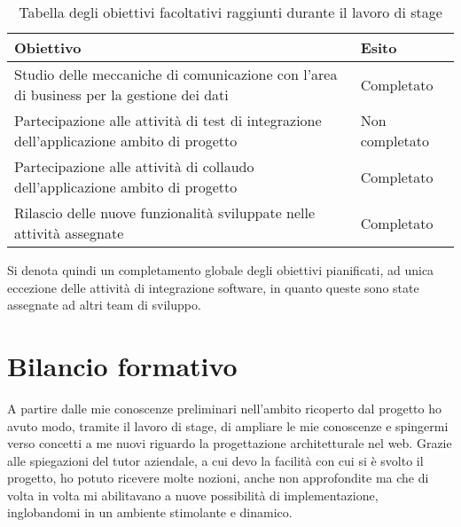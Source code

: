 	\begin{table}[H]
		\def\arraystretch{1.2}
		\begin{tabular}{ | p{10cm} | p{2cm} | }
		
		\rowcolor{Gray}
		\hline \textbf{Obiettivo} & \textbf{Esito} \\ \hline
		
		Studio delle meccaniche di comunicazione con l'area di business per la gestione dei dati & Completato \\ \hline
		Partecipazione alle attività di test di integrazione dell'applicazione ambito di progetto & Non \newline completato \\ \hline
		Partecipazione alle attività di collaudo dell'applicazione ambito di progetto & Completato \\ \hline
		Rilascio delle nuove funzionalità sviluppate nelle attività assegnate & Completato \\ \hline
		
		\end{tabular}
		\vspace{1mm}
		\caption{Tabella degli obiettivi facoltativi raggiunti durante il lavoro di stage}
	\end{table}

Si denota quindi un completamento globale degli obiettivi pianificati, ad unica eccezione delle attività di integrazione software, in quanto queste sono state assegnate ad altri team di sviluppo.

\newpage
\section{Bilancio formativo}

A partire dalle mie conoscenze preliminari nell'ambito ricoperto dal progetto ho avuto modo, tramite il lavoro di stage, di ampliare le mie conoscenze e spingermi verso concetti a me nuovi riguardo la progettazione architetturale nel web. Grazie alle spiegazioni del tutor aziendale, a cui devo la facilità con cui si è svolto il progetto, ho potuto ricevere molte nozioni, anche non approfondite ma che di volta in volta mi abilitavano a nuove possibilità di implementazione, inglobandomi in un ambiente stimolante e dinamico.\\

